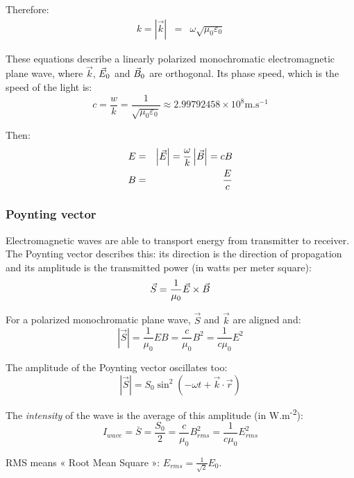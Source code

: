 \documentclass[a4paper,10pt]{article}
\newcommand{\vE}{\ensuremath\vec{E}} %
\newcommand{\vB}{\ensuremath\vec{B}} %
\begin{document}
Therefore:
\begin{eqnarray}
  k = |\vec{k}| &=& \omega \sqrt{\mu_0 \varepsilon_0}
\end{eqnarray}

These equations describe a linearly polarized monochromatic electromagnetic plane wave, where $\vec{k}$, $\vE_0$ and $\vB_0$ are orthogonal.
Its phase speed, which is the speed of the light is:
\begin{equation}
  c = \frac{w}{k} = \frac{1}{\sqrt{\mu_0 \varepsilon_0}} \approx 2.99792458 \times 10^8 \text{m.s}^{-1}
\end{equation}

Then:
\begin{eqnarray}
  E &=& \left|\vE\right| = \frac{\omega}{k} \left|\vB\right| = c B \\
  B &=& \frac{E}{c}
\end{eqnarray}

\subsubsection{Poynting vector}

Electromagnetic waves are able to transport energy from transmitter to receiver.
The Poynting vector describes this: its direction is the direction of propagation and its amplitude is the transmitted power (in watts per meter square):
\begin{equation}
  \vec{S} = \frac{1}{\mu_0} \vE \times \vB
\end{equation}

For a polarized monochromatic plane wave, $\vec{S}$ and $\vec{k}$ are aligned and:
\begin{equation}
  \left|\vec{S}\right| = \frac{1}{\mu_0} E B = \frac{c}{\mu_0} B^2 = \frac{1}{c\mu_0} E^2
\end{equation}

The amplitude of the Poynting vector oscillates too:
\begin{equation}
  \left|\vec{S}\right| = S_0 \sin^2\left(-\omega t + \vec{k} \cdot \vec{r}\right)
\end{equation}

The \emph{intensity} of the wave is the average of this amplitude (in W.m\textsuperscript{-2}):
\begin{equation}
  I_{wave} = \bar{S} = \frac{S_0}{2} = \frac{c}{\mu_0} B_{rms}^2 = \frac{1}{c\mu_0} E_{rms}^2
\end{equation}

RMS means « Root Mean Square »: $E_{rms} = \frac{1}{\sqrt{2}} E_0$.
\end{document}
